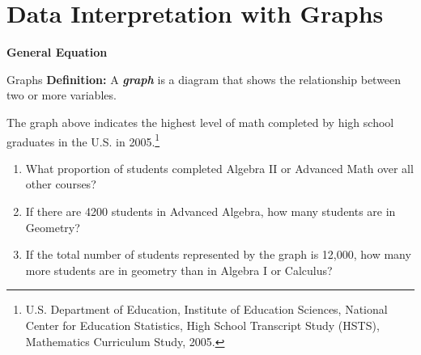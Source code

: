 \section{Data Interpretation with Graphs}
\textbf{General Equation}

\bigskip
\begin{equationbox}{Graphs}
\textbf{Definition:} A \textbf{\textit{graph}} is a diagram that shows the relationship between two or more variables.
\end{equationbox}

\begin{center}
\end{center}

The graph above indicates the highest level of math completed by high school graduates in the U.S. in 2005.\footnote{U.S. Department of Education, Institute of Education Sciences, National Center for Education Statistics, High School Transcript Study (HSTS), Mathematics Curriculum Study, 2005.}

\begin{enumerate}[labelindent=*,style=multiline,leftmargin=*,label=\textbf{Example \arabic*:}]
\item What proportion of students completed Algebra II or Advanced Math over all other courses?
\vfill\item If there are 4200 students in Advanced Algebra, how many students are in Geometry?
\vfill\item If the total number of students represented by the graph is 12,000, how many more students are in geometry than in Algebra I or Calculus?
\end{enumerate}

\vfill
\newpage
\begin{center}
\end{center}

